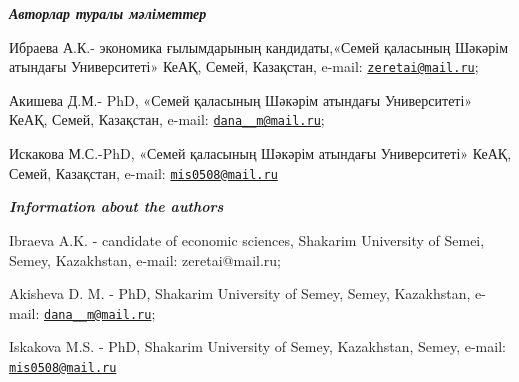 \begin{authorinfo}

\hspace{1em}\emph{{\bfseries Авторлар туралы мәліметтер}}

Ибраева А.К.- экономика ғылымдарының кандидаты,«Семей қаласының Шәкәрім
атындағы Университеті» КеАҚ, Семей, Казақстан, e-mail:
\href{mailto:ZEretai@mail.ru}{\nolinkurl{zeretai@mail.ru}};

Акишева Д.М.- PhD, «Семей қаласының Шәкәрім атындағы Университеті» КеАҚ,
Семей, Казақстан, e-mail:
\href{mailto:dana__m@mail.ru}{\nolinkurl{dana\_\_m@mail.ru}};

Искакова М.С.-PhD, «Семей қаласының Шәкәрім атындағы Университеті» КеАҚ,
Семей, Казақстан, e-mail:
\href{mailto:mis0508@mail.ru}{\nolinkurl{mis0508@mail.ru}}

\hspace{1em}\emph{{\bfseries Information about the authors}}

Ibraeva A.K. - candidate of economic sciences, Shakarim University of
Semei, Semey, Kazakhstan, e-mail: zeretai@mail.ru;

Akisheva D. M. - PhD, Shakarim University of Semey, Semey, Kazakhstan,
e-mail: \href{mailto:dana__m@mail.ru}{\nolinkurl{dana\_\_m@mail.ru}};

Iskakova M.S. - PhD, Shakarim University of Semey, Kazakhstan, Semey,
e-mail: \href{mailto:mis0508@mail.ru}{\nolinkurl{mis0508@mail.ru}}
\end{authorinfo}
